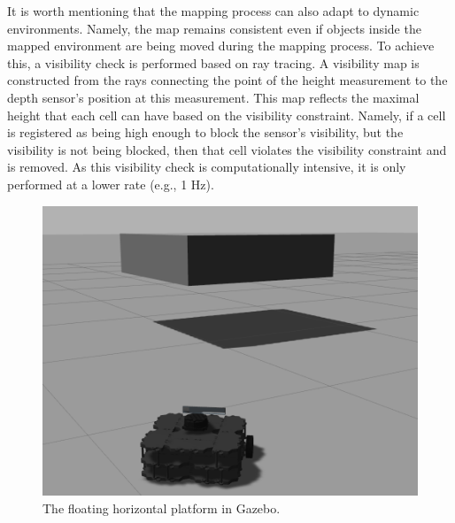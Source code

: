 \documentclass{article}
\begin{document}
It is worth mentioning that the mapping process can also adapt to dynamic environments. Namely, the map remains consistent even if objects inside the mapped environment are being moved during the mapping process. To achieve this, a visibility check is performed based on ray tracing. A visibility map is constructed from the rays connecting the point of the height measurement to the depth sensor’s position at this measurement. This map reflects the maximal height that each cell can have based on the visibility constraint. Namely, if a cell is registered as being high enough to block the sensor's visibility, but the visibility is not being blocked, then that cell violates the visibility constraint and is removed.
As this visibility check is computationally intensive, it is only performed at a lower rate (e.g., 1 Hz).

\begin{figure}[h] %
    \centering
	\includegraphics[width=\textwidth,height=\textheight,keepaspectratio]{report1-img024.png} %
	\caption{The floating horizontal platform in Gazebo. }
\end{figure}
\end{document}
